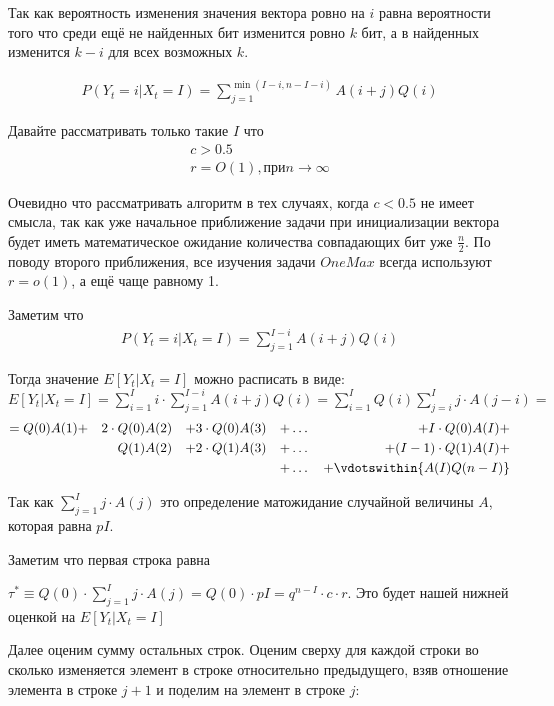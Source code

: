 \documentclass[times]{itmo-student-thesis}
\newcommand{\EY}{E[Y_t| X_t = I]}
\begin{document}
    Так как вероятность изменения значения вектора ровно на $i$ равна вероятности того что среди ещё не найденных бит изменится ровно $k$ бит, а в найденных изменится $k - i$ для всех возможных $k$.

    \begin{gather*}
        P(Y_t = i|X_t=I) = \sum_{j=1}^{\min(I - i, n - I - i)} A(i + j)Q(i)
    \end{gather*}

    Давайте рассматривать только такие $I$ что
    \begin{gather*}
        c > 0.5 \\
        r = O(1), при n \rightarrow \infty
    \end{gather*}

    Очевидно что рассматривать алгоритм в тех случаях, когда $c < 0.5$ не имеет смысла, так как уже начальное приближение задачи при инициализации вектора будет иметь математическое ожидание количества совпадающих бит уже $\frac{n}{2}$.
    По поводу второго приближения, все изучения задачи $OneMax$ всегда используют $r = o(1)$, а ещё чаще равному 1.

    Заметим что
    \begin{gather*}
        P(Y_t = i|X_t=I) = \sum_{j=1}^{I - i} A(i + j)Q(i)
    \end{gather*}

    Тогда значение $\EY$ можно расписать в виде:
    $\EY = \sum_{i=1}^I i \cdot \sum_{j=1}^{I - i} A(i + j)Q(i) = \sum_{i=1}^I Q(i) \sum_{j=i}^{I} j \cdot A(j - i) =$
    \begin{align*}
        = Q(0)A(1) + && 2\cdot Q(0)A(2) && + 3\cdot Q(0)A(3) && + {}\ldots{} && + I\cdot Q(0)A(I) + & \\
        && Q(1)A(2)   && + 2\cdot Q(1)A(3) && + {}\ldots{} && + (I-1)\cdot Q(1)A(I)  + &\\
        && && && + {}\ldots{} && + \vdotswithin{A(I)Q(n - I)} &
    \end{align*}

    Так как $\sum_{j=1}^{I} j \cdot A(j)$ это определение матожидание случайной величины $A$, которая равна $pI$.

    Заметим что первая строка равна

    $\tau^* \equiv Q(0) \cdot \sum_{j=1}^{I} j \cdot A(j) = Q(0) \cdot pI = q^{n - I} \cdot c \cdot r$. Это будет нашей нижней оценкой на $\EY$

    Далее оценим сумму остальных строк.
    Оценим сверху для каждой строки во сколько изменяется элемент в строке относительно предыдущего, взяв отношение элемента в строке $j + 1$ и поделим на элемент в строке $j$:
\end{document}
